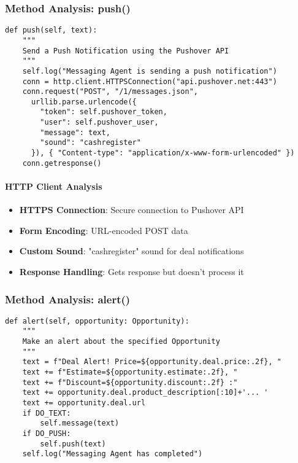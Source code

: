 \subsubsection{Method Analysis: push()}

\begin{lstlisting}[caption=Push Notification Implementation]
def push(self, text):
    """
    Send a Push Notification using the Pushover API
    """
    self.log("Messaging Agent is sending a push notification")
    conn = http.client.HTTPSConnection("api.pushover.net:443")
    conn.request("POST", "/1/messages.json",
      urllib.parse.urlencode({
        "token": self.pushover_token,
        "user": self.pushover_user,
        "message": text,
        "sound": "cashregister"
      }), { "Content-type": "application/x-www-form-urlencoded" })
    conn.getresponse()
\end{lstlisting}

\paragraph{HTTP Client Analysis}
\begin{itemize}
\item \textbf{HTTPS Connection}: Secure connection to Pushover API
\item \textbf{Form Encoding}: URL-encoded POST data
\item \textbf{Custom Sound}: "cashregister" sound for deal notifications
\item \textbf{Response Handling}: Gets response but doesn't process it
\end{itemize}

\subsubsection{Method Analysis: alert()}

\begin{lstlisting}[caption=Opportunity Alert Processing]
def alert(self, opportunity: Opportunity):
    """
    Make an alert about the specified Opportunity
    """
    text = f"Deal Alert! Price=${opportunity.deal.price:.2f}, "
    text += f"Estimate=${opportunity.estimate:.2f}, "
    text += f"Discount=${opportunity.discount:.2f} :"
    text += opportunity.deal.product_description[:10]+'... '
    text += opportunity.deal.url
    if DO_TEXT:
        self.message(text)
    if DO_PUSH:
        self.push(text)
    self.log("Messaging Agent has completed")
\end{lstlisting}

